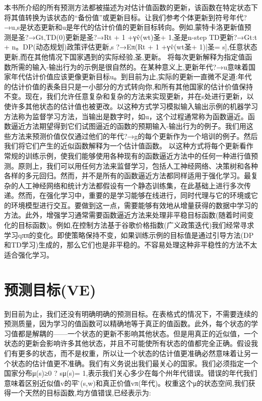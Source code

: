 本书所介绍的所有预测方法都被描述为对估计值函数的更新，该函数在特定状态下将其值转换为该状态的“备份值”或更新目标。让我们参考个体更新到符号年代?→u,s是状态更新和u是年代的估计价值的更新目标转向。例如,蒙特卡洛更新值预测是圣?→Gt,TD(0)更新是圣?→Rt + 1 +γv̂(wt)圣+ 1,圣是n-step TD更新?→Gt:t + n。DP(动态规划)政策评估更新,s ?→Eπ(Rt + 1 +γv̂(wt圣+ 1)|圣= s],任意状态更新,而在其他情况下国家遇到的实际经验,圣,更新。
将每次更新解释为指定值函数所需的输入-输出行为的示例是很自然的。在某种意义上,更新年代?→u意味着国家年代估计价值应该更像更新目标u。到目前为止,实际的更新一直微不足道:年代的估计价值的表条目只是一小部分的方式转向你,和所有其他国家的估计价值保持不变。现在，我们允许任意复杂和复杂的方法来实现更新，并在s处进行更新，以使许多其他状态的估计值也被更改。以这种方式学习模拟输入输出示例的机器学习方法称为监督学习方法，当输出是数字时，如u，这个过程通常称为函数逼近。函数逼近方法期望得到它们试图逼近的函数的预期输入-输出行为的例子。我们用这些方法来预测价值仅仅通过他们的年代?→g的每个更新作为一个培训的例子。然后我们将它们产生的近似函数解释为一个估计值函数。
以这种方式将每个更新看作常规的训练示例，使我们能够使用各种现有的函数逼近方法中的任何一种进行值预测。原则上，我们可以用任何方法来监督学习，包括人工神经网络、决策树和各种各样的多元回归。然而，并不是所有的函数逼近方法都同样适用于强化学习。最复杂的人工神经网络和统计方法都假设有一个静态训练集，在此基础上进行多次传递。然而，在强化学习中，重要的是学习能够在线进行，同时代理与它的环境或它的环境模型进行交互。要做到这一点，需要能够有效地从增量获得的数据中学习的方法。此外，增强学习通常需要函数逼近方法来处理非平稳目标函数(随着时间变化的目标函数)。例如,在控制方法基于谷歌价格指数(广义政策迭代)我们经常寻求学习qππ的变化。即使策略保持不变，如果训练示例的目标值是通过引导方法(DP和TD学习)生成的，那么它们也是非平稳的。不容易处理这种非平稳性的方法不太适合强化学习。

\section{预测目标(VE)}
到目前为止，我们还没有明确明确的预测目标。在表格式的情况下，不需要连续的预测质量，因为学习的值函数可以精确地等于真正的值函数。此外，每个状态的学习值都是解耦的——一个状态的更新不影响其他状态。但是用真正的近似值，一个状态的更新会影响许多其他状态，并且不可能使所有状态的值都完全正确。假设我们有更多的状态，而不是权重，所以让一个状态的估计值更准确必然意味着让另一个状态的估计值更不准确。我们有义务说出我们最关心的国家。我们必须指定一个国家分布μ(s)≥0 ? sμ(s)= 1,表示我们关心多少在每个州年代错误。错误的年代我们意味着区别近似值v的平方̂(s,w)和真正价值vπ(年代)。权重这个μ的状态空间,我们获得一个天然的目标函数,均方值错误,已经表示为:
 
